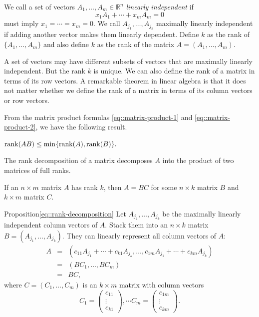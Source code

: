 We call a set of vectors $A_1, \ldots, A_m \in \mathbb{R}^{n}$ {\it linearly independent} if 
$$
x_1 A_1 + \cdots + x_m A_m = 0 
$$
must imply $x_1= \cdots = x_m = 0$. 
We call $A_{j_1}, \ldots, A_{j_k}$ maximally linearly independent if adding another vector makes them linearly dependent. Define $k$ as the rank of $\{A_1, \ldots, A_m\}$ and also define $k$ as the rank of the matrix $A = (A_1, \ldots, A_m)$. 


A set of vectors may have different subsets of vectors that are maximally linearly independent. But the rank $k$ is unique. We can also define the rank of a matrix in terms of its row vectors. A remarkable theorem in linear algebra is that it does not matter whether we define the rank of a matrix in terms of its column vectors or row vectors. 


From the matrix product formulas \eqref{eq::matrix-product-1} and \eqref{eq::matrix-product-2}, we have the following result.



\begin{proposition}\label{eq::matrix-product-inequality}
$
\textup{rank}(AB) \leq  \min\{  \textup{rank}(A),  \textup{rank}(B) \} . 
$
\end{proposition}


The rank decomposition of a matrix decomposes $A$ into the product of two matrices of full ranks. 

\begin{proposition}\label{eq::rank-decomposition}
If an $n\times m$ matrix $A$ has rank $k$, then $A = BC$ for some $n\times k$ matrix $B$ and $k\times m$ matrix $C$. 
\end{proposition}

\begin{myproof}{Proposition}{\ref{eq::rank-decomposition}}
Let $A_{j_1}, \ldots, A_{j_k}$ be the maximally linearly independent column vectors of $A$. Stack them into an $n\times k$ matrix $B = (A_{j_1}, \ldots, A_{j_k}) $. They can linearly represent all column vectors of $A$:
\begin{eqnarray*}
A &=& (c_{11} A_{j_1} + \cdots + c_{k1} A_{j_k}, \ldots, c_{1m} A_{j_1} + \cdots + c_{km} A_{j_k} ) \\
&=&  (BC_1, \ldots, B C_m) \\ 
&=& BC,
\end{eqnarray*}
where $C =  ( C_1, \ldots,  C_m)$ is an $k\times m$ matrix with column vectors
$$
C_1 = \begin{pmatrix}
c_{11}  \\
\vdots\\
 c_{k1}
\end{pmatrix},\cdots 
C_m = \begin{pmatrix}
 c_{1m} \\
 \vdots \\
 c_{km}
\end{pmatrix}.
$$
\end{myproof}


